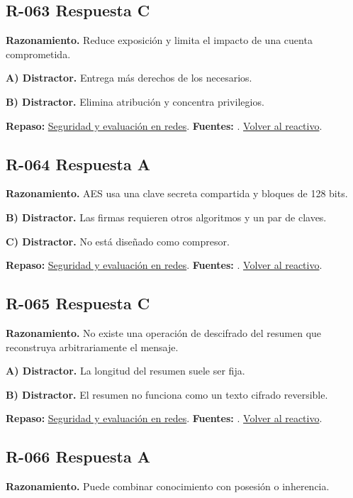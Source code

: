 \subsection*{R-063 \quad Respuesta C}\label{s:R-063}
\textbf{Razonamiento.} Reduce exposición y limita el impacto de una cuenta comprometida.

\textbf{A) Distractor. }Entrega más derechos de los necesarios.

\textbf{B) Distractor. }Elimina atribución y concentra privilegios.

\textbf{Repaso:} \hyperref[sec:r3]{Seguridad y evaluación en redes}. \textbf{Fuentes:} \cite{nistsecurity,owasp,aes,tls}. \hyperref[q:R-063]{Volver al reactivo}.\par\medskip

\subsection*{R-064 \quad Respuesta A}\label{s:R-064}
\textbf{Razonamiento.} AES usa una clave secreta compartida y bloques de 128 bits.

\textbf{B) Distractor. }Las firmas requieren otros algoritmos y un par de claves.

\textbf{C) Distractor. }No está diseñado como compresor.

\textbf{Repaso:} \hyperref[sec:r3]{Seguridad y evaluación en redes}. \textbf{Fuentes:} \cite{aes}. \hyperref[q:R-064]{Volver al reactivo}.\par\medskip

\subsection*{R-065 \quad Respuesta C}\label{s:R-065}
\textbf{Razonamiento.} No existe una operación de descifrado del resumen que reconstruya arbitrariamente el mensaje.

\textbf{A) Distractor. }La longitud del resumen suele ser fija.

\textbf{B) Distractor. }El resumen no funciona como un texto cifrado reversible.

\textbf{Repaso:} \hyperref[sec:r3]{Seguridad y evaluación en redes}. \textbf{Fuentes:} \cite{nistsecurity,owasp,aes,tls}. \hyperref[q:R-065]{Volver al reactivo}.\par\medskip

\subsection*{R-066 \quad Respuesta A}\label{s:R-066}
\textbf{Razonamiento.} Puede combinar conocimiento con posesión o inherencia.

